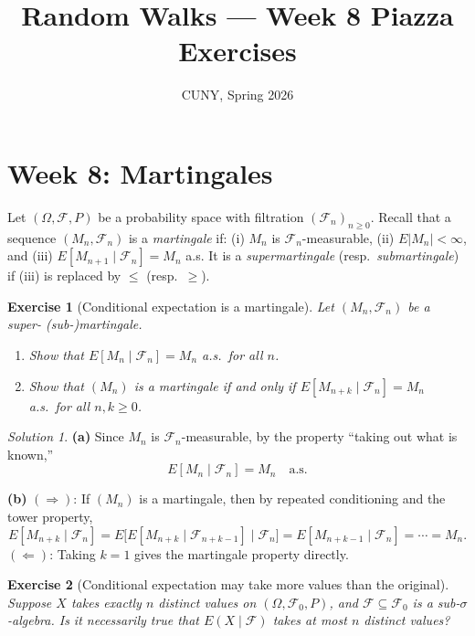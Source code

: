 \documentclass[12pt]{article}
\title{Random Walks --- Week 8 Piazza Exercises}
\author{CUNY, Spring 2026}
\date{}
\newtheorem{exercise}{Exercise}
\theoremstyle{remark}
\newtheorem*{solution}{Solution}
\begin{document}
\maketitle

\section*{Week 8: Martingales}

Let $(\Omega, \mathcal{F}, P)$ be a probability space with filtration $(\mathcal{F}_n)_{n \ge 0}$.
Recall that a sequence $(M_n, \mathcal{F}_n)$ is a \emph{martingale} if:
(i) $M_n$ is $\mathcal{F}_n$-measurable, (ii) $E|M_n| < \infty$, and
(iii) $E[M_{n+1} \mid \mathcal{F}_n] = M_n$ a.s.  It is a \emph{supermartingale}
(resp.\ \emph{submartingale}) if (iii) is replaced by $\le$ (resp.\ $\ge$).

\begin{exercise}[Conditional expectation is a martingale]
Let $(M_n, \mathcal{F}_n)$ be a super- (sub-)martingale.
\begin{enumerate}
  \item[(a)] Show that $E[M_n \mid \mathcal{F}_n] = M_n$ a.s.\ for all $n$.
  \item[(b)] Show that $(M_n)$ is a martingale if and only if
             $E[M_{n+k} \mid \mathcal{F}_n] = M_n$ a.s.\ for all $n, k \ge 0$.
\end{enumerate}
\end{exercise}

\begin{solution}
\textbf{(a)} Since $M_n$ is $\mathcal{F}_n$-measurable, by the property
``taking out what is known,''
\[
  E[M_n \mid \mathcal{F}_n] = M_n \quad \text{a.s.}
\]

\textbf{(b)} $(\Rightarrow)$: If $(M_n)$ is a martingale, then by repeated conditioning
and the tower property,
\[
  E[M_{n+k} \mid \mathcal{F}_n]
  = E\bigl[E[M_{n+k} \mid \mathcal{F}_{n+k-1}] \mid \mathcal{F}_n\bigr]
  = E[M_{n+k-1} \mid \mathcal{F}_n]
  = \cdots = M_n.
\]
$(\Leftarrow)$: Taking $k = 1$ gives the martingale property directly.
\end{solution}

\begin{exercise}[Conditional expectation may take more values than the original]
Suppose $X$ takes exactly $n$ distinct values on $(\Omega, \mathcal{F}_0, P)$, and
$\mathcal{F} \subseteq \mathcal{F}_0$ is a sub-$\sigma$-algebra.  Is it necessarily true
that $E(X \mid \mathcal{F})$ takes at most $n$ distinct values?
\end{exercise}
\end{document}
